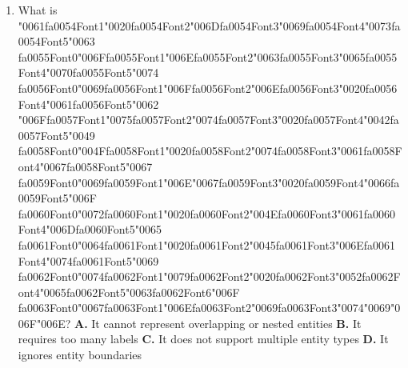 \documentclass[11pt]{article}
\begin{document}
\begin{enumerate}[leftmargin=*]
  \item What is {\char"0061}{\csname fa0054Font1\endcsname\char"0020}{\csname fa0054Font2\endcsname\char"006D}{\csname fa0054Font3\endcsname\char"0069}{\csname fa0054Font4\endcsname\char"0073}{\csname fa0054Font5\endcsname\char"0063} {\csname fa0055Font0\endcsname\char"006F}{\csname fa0055Font1\endcsname\char"006E}{\csname fa0055Font2\endcsname\char"0063}{\csname fa0055Font3\endcsname\char"0065}{\csname fa0055Font4\endcsname\char"0070}{\csname fa0055Font5\endcsname\char"0074} {\csname fa0056Font0\endcsname\char"0069}{\csname fa0056Font1\endcsname\char"006F}{\csname fa0056Font2\endcsname\char"006E}{\csname fa0056Font3\endcsname\char"0020}{\csname fa0056Font4\endcsname\char"0061}{\csname fa0056Font5\endcsname\char"0062} {\char"006F}{\csname fa0057Font1\endcsname\char"0075}{\csname fa0057Font2\endcsname\char"0074}{\csname fa0057Font3\endcsname\char"0020}{\csname fa0057Font4\endcsname\char"0042}{\csname fa0057Font5\endcsname\char"0049} {\csname fa0058Font0\endcsname\char"004F}{\csname fa0058Font1\endcsname\char"0020}{\csname fa0058Font2\endcsname\char"0074}{\csname fa0058Font3\endcsname\char"0061}{\csname fa0058Font4\endcsname\char"0067}{\csname fa0058Font5\endcsname\char"0067} {\csname fa0059Font0\endcsname\char"0069}{\csname fa0059Font1\endcsname\char"006E}{\char"0067}{\csname fa0059Font3\endcsname\char"0020}{\csname fa0059Font4\endcsname\char"0066}{\csname fa0059Font5\endcsname\char"006F} {\csname fa0060Font0\endcsname\char"0072}{\csname fa0060Font1\endcsname\char"0020}{\csname fa0060Font2\endcsname\char"004E}{\csname fa0060Font3\endcsname\char"0061}{\csname fa0060Font4\endcsname\char"006D}{\csname fa0060Font5\endcsname\char"0065} {\csname fa0061Font0\endcsname\char"0064}{\csname fa0061Font1\endcsname\char"0020}{\csname fa0061Font2\endcsname\char"0045}{\csname fa0061Font3\endcsname\char"006E}{\csname fa0061Font4\endcsname\char"0074}{\csname fa0061Font5\endcsname\char"0069} {\csname fa0062Font0\endcsname\char"0074}{\csname fa0062Font1\endcsname\char"0079}{\csname fa0062Font2\endcsname\char"0020}{\csname fa0062Font3\endcsname\char"0052}{\csname fa0062Font4\endcsname\char"0065}{\csname fa0062Font5\endcsname\char"0063}{\csname fa0062Font6\endcsname\char"006F} {\csname fa0063Font0\endcsname\char"0067}{\csname fa0063Font1\endcsname\char"006E}{\csname fa0063Font2\endcsname\char"0069}{\csname fa0063Font3\endcsname\char"0074}{\char"0069}{\char"006F}{\char"006E}?
    \textbf{A.} It cannot represent overlapping or nested entities
    \textbf{B.} It requires too many labels
    \textbf{C.} It does not support multiple entity types
    \textbf{D.} It ignores entity boundaries


\end{enumerate}
\end{document}
